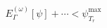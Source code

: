 \documentclass[preview]{standalone}
\begin{document}
\begin{align*}
E_{\Gamma}^{(\omega)}[\psi]+\cdots<\psi_{T_r}^{\max}
\end{align*}
\end{document}

